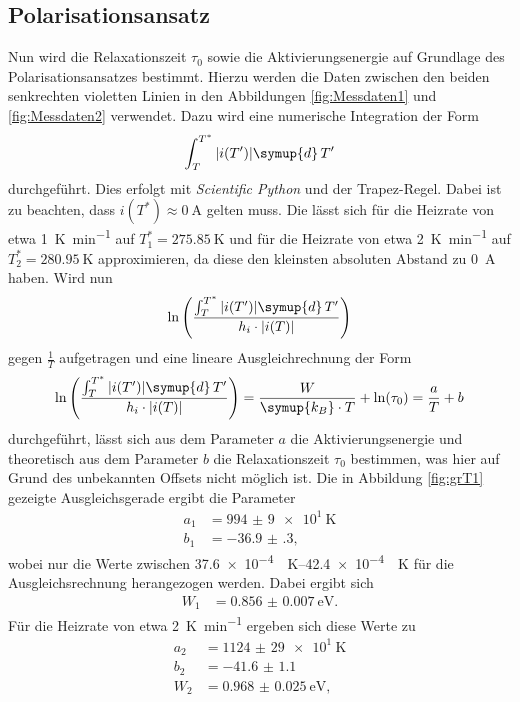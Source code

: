 \subsection{Polarisationsansatz}
\label{sec:grT}
Nun wird die Relaxationszeit $\tau_0$ sowie die Aktivierungsenergie auf Grundlage des Polarisationsansatzes bestimmt.
Hierzu werden die Daten zwischen den beiden senkrechten violetten Linien in den Abbildungen \ref{fig:Messdaten1} und \ref{fig:Messdaten2} verwendet.
Dazu wird eine numerische Integration der Form
\begin{equation}
    \label{eqn:int}
    \int_T^{T^*} |i(T')| \symup{d}\,T'
\end{equation}
durchgeführt. Dies erfolgt mit \textit{Scientific Python} \cite{scipy} und der Trapez-Regel. Dabei ist zu beachten, dass $i(T^*) \approx \SI{0}{\ampere}$ gelten muss.
Die lässt sich für die Heizrate von etwa \SI{1}{\kelvin\per\minute} auf $T^*_1 = \SI{275.85}{\kelvin}$ und für die Heizrate von etwa \SI{2}{\kelvin\per\minute} 
auf $T^*_2 = \SI{280.95}{\kelvin}$ approximieren, da diese den kleinsten absoluten Abstand zu \SI{0}{\ampere} haben.
Wird nun
\begin{equation*}
    \ln\left(\frac{\int_T^{T^*} |i(T')| \symup{d}\,T'}{h_i \cdot |i(T)|}\right)
\end{equation*}
gegen $\frac{1}{T}$ aufgetragen und eine lineare Ausgleichrechnung der Form
\begin{equation}
    \label{eqn:lin2}
    \ln\left(\frac{\int_T^{T^*} |i(T')| \symup{d}\,T'}{h_i \cdot |i(T)|}\right) = \frac{W}{\symup{k_B} \cdot T} + \ln(\tau_0) = \frac{a}{T} + b
\end{equation}
durchgeführt, lässt sich aus dem Parameter $a$ die Aktivierungsenergie und theoretisch aus dem Parameter $b$ die Relaxationszeit $\tau_0$ bestimmen,
was hier auf Grund des unbekannten Offsets nicht möglich ist.
Die in Abbildung \ref{fig:grT1} gezeigte Ausgleichsgerade ergibt die Parameter
\begin{align*}
    a_1 &= \SI{994(9)e1}{\kelvin} \\
    b_1 &= \num{-36.9(3)},
\end{align*}
wobei nur die Werte zwischen \SIrange{37.6e-4}{42.4e-4}{\per\kelvin} für die Ausgleichsrechnung herangezogen werden. Dabei ergibt sich
\begin{align*}
    W_1 &= \SI{0.856(7)}{\electronvolt}.
\end{align*}
Für die Heizrate von etwa \SI{2}{\kelvin\per\minute} ergeben sich diese Werte zu
\begin{align*}
    a_2 &= \SI{1124(29)e1}{\kelvin} \\
    b_2 &= \num{-41.6(11)} \\
    W_2 &= \SI{0.968(25)}{\electronvolt},
\end{align*}
